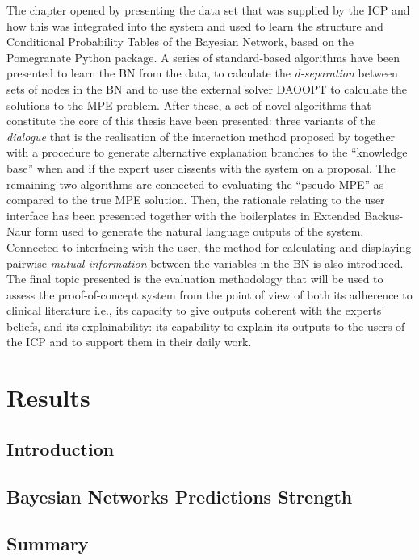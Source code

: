 \documentclass[mscthesis]{usiinfthesis}
\begin{document}
The chapter opened by presenting the data set that was supplied by the ICP and how this was integrated into the system and used to learn the structure and Conditional Probability Tables of the Bayesian Network, based on the Pomegranate Python package.
A series of standard-based algorithms have been presented to learn the BN from the data, to calculate the \textit{d-separation} between sets of nodes in the BN and to use the external solver DAOOPT to calculate the solutions to the MPE problem.
After these, a set of novel algorithms that constitute the core of this thesis have been presented: three variants of the \textit{dialogue} that is the realisation of the interaction method proposed by \cite{Butz2018} together with a procedure to generate alternative explanation branches to the \enquote{knowledge base} when and if the expert user dissents with the system on a proposal.
The remaining two algorithms are connected to evaluating the \enquote{pseudo-MPE} as compared to the true MPE solution.
Then, the rationale relating to the user interface has been presented together with the boilerplates in Extended Backus-Naur form used to generate the natural language outputs of the system.
Connected to interfacing with the user, the method for calculating and displaying pairwise \textit{mutual information} between the variables in the BN is also introduced.
The final topic presented is the evaluation methodology that will be used to assess the proof-of-concept system from the point of view of both its adherence to clinical literature i.e., its capacity to give outputs coherent with the experts' beliefs, and its explainability: its capability to explain its outputs to the users of the ICP and to support them in their daily work.

\chapter{Results}\label{chap:results}
\section{Introduction}


\section{Bayesian Networks Predictions Strength} \label{sec:prediction-evaluation}


\section{Summary}
\end{document}
